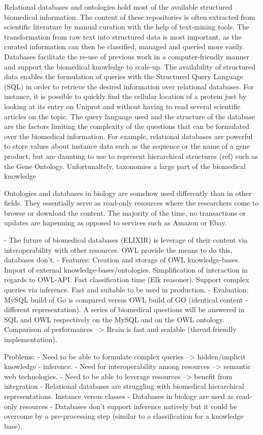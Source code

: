 \documentclass{bioinfo}
\begin{document}
Relational databases and ontologies hold most of the available structured biomedical information. The content of these repositories is often
extracted from scientific literature by manual curation with the help of text-mining tools. The transformation from raw text into
structured data is most important, as the curated information can then be classified, managed and queried more easily. Databases facilitate
the re-use of previous work in a computer-friendly manner and support the biomedical knowledge to scale-up. 
The availability of structured data enables the formulation of queries with the Structured Query Language (SQL) in order to retrieve the desired 
information over relational databases. For instance, it is possible to
quickly find the cellular location of a protein just by looking at its entry on Uniprot and without having to read several scientific articles
on the topic. The query language used and the structure of the database are the factors limiting the complexity of the questions that can be 
formulated over the biomedical information. For example, relational databases are powerful to store values about instance data such as the
sequence or the name of a gene product, but are daunting to use to represent hierarchical structures (ref) such as the Gene Ontology.
Unfortunaltely, taxonomies a large part of the biomedical knowledge 


Ontologies and databases in biology are somehow used differently than in other fields. They essentially serve as read-only 
resources where the researchers come to browse or download the content. The majority of the time, no transactions or updates 
are hapenning as opposed to services such as Amazon or Ebay.

- The future of biomedical databases (ELIXIR) is leverage of their content via interoperability with other resources.
OWL provide the means to do this, databases don't.
- Features: Creation and storage of OWL knowledge-bases. 
Import of external knowledge-bases/ontologies. 
Simplification of interaction in regards to OWL-API. Fast classification time (Elk reasoner). 
Support complex queries via inference. Fast and suitable to be used in production.
- Evaluation: MySQL build of Go is compared versus OWL build of GO (identical content - different representation).
A series of biomedical questions will be answered in SQL and OWL respectively on the MySQL and on the OWL ontology.
Comparison of performances --> Brain is fast and scalable (thread friendly implementation).

Problems:
- Need to be able to formulate complex queries --> hidden/implicit knowledge - inference.
- Need for interoperability among resources --> semantic web technologies.
- Need to be able to leverage resources --> benefit from integration
- Relational databases are struggling with biomedical hierarchical representations. Instance versus classes
- Databases in biology are used as read-only resources
- Databases don't support inference natively but it could be overcome by a
 pre-processing step (similar to a classification for a knowledge base).
\end{document}
